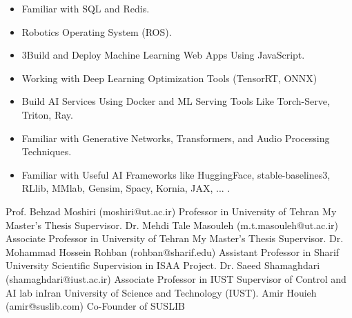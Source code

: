 \documentclass[9pt]{developercv} %
\begin{document}
\renewcommand\labelitemi{\large$\bullet$}
\begin{itemize}

\item Familiar with SQL and Redis.

\item Robotics Operating System (ROS).

\item 3Build and Deploy Machine Learning Web Apps Using JavaScript.

\item Working with Deep Learning Optimization Tools (TensorRT, ONNX)

\item Build AI Services Using Docker and ML Serving Tools Like Torch-Serve, Triton, Ray.

\item Familiar with Generative Networks, Transformers, and Audio Processing Techniques.

\item Familiar with Useful AI Frameworks like HuggingFace, stable-baselines3, RLlib, MMlab, Gensim, Spacy, Kornia, JAX, ... .

\end{itemize}



\begin{entrylist}
	\entry
		{ }
		{Prof. Behzad Moshiri {\small(moshiri@ut.ac.ir)}}
		{Professor in University of Tehran}	
		{My Master’s Thesis Supervisor.}
	\entry
		{ }
		{Dr. Mehdi Tale Masouleh {\small(m.t.masouleh@ut.ac.ir)}}
		{Associate Professor in University of Tehran}	
		{My Master’s Thesis Supervisor.}		
	\entry
		{ }
		{Dr. Mohammad Hossein Rohban {\small(rohban@sharif.edu)}}
		{Assistant Professor in Sharif University}	
		{Scientific Supervision in ISAA Project.}
	\entry
		{ }
		{Dr. Saeed Shamaghdari {\small(shamaghdari@iust.ac.ir)}}
		{Associate Professor in IUST}	
		{Supervisor of Control and AI lab inIran University of Science and Technology (IUST).}
	\entry
		{ }
		{Amir Houieh {\small(amir@suslib.com)}}
		{Co-Founder of SUSLIB}	
		{ }

		
\end{entrylist}
\end{document}
